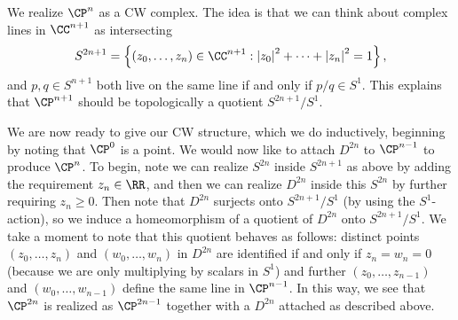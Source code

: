 \documentclass[../notes.tex]{subfiles}
\begin{document}
\begin{example}
	We realize $\CP^n$ as a CW complex. The idea is that we can think about complex lines in $\CC^{n+1}$ as intersecting
	\[S^{2n+1}=\left\{(z_0,\ldots,z_n)\in\CC^{n+1}:\left|z_0\right|^2+\cdots+\left|z_n\right|^2=1\right\},\]
	and $p,q\in S^{n+1}$ both live on the same line if and only if $p/q\in S^1$. This explains that $\CP^{n+1}$ should be topologically a quotient $S^{2n+1}/S^1$.
	
	We are now ready to give our CW structure, which we do inductively, beginning by noting that $\CP^0$ is a point. We would now like to attach $D^{2n}$ to $\CP^{n-1}$ to produce $\CP^n$. To begin, note we can realize $S^{2n}$ inside $S^{2n+1}$ as above by adding the requirement $z_n\in\RR$, and then we can realize $D^{2n}$ inside this $S^{2n}$ by further requiring $z_n\ge0$. Then note that $D^{2n}$ surjects onto $S^{2n+1}/S^1$ (by using the $S^1$-action), so we induce a homeomorphism of a quotient of $D^{2n}$ onto $S^{2n+1}/S^1$. We take a moment to note that this quotient behaves as follows: distinct points $(z_0,\ldots,z_n)$ and $(w_0,\ldots,w_n)$ in $D^{2n}$ are identified if and only if $z_n=w_n=0$ (because we are only multiplying by scalars in $S^1$) and further $(z_0,\ldots,z_{n-1})$ and $(w_0,\ldots,w_{n-1})$ define the same line in $\CP^{n-1}$. In this way, we see that $\CP^{2n}$ is realized as $\CP^{2n-1}$ together with a $D^{2n}$ attached as described above.
\end{example}
\end{document}
